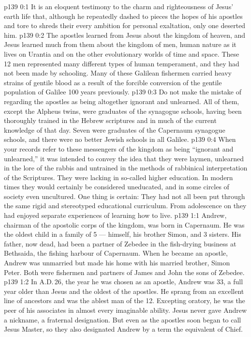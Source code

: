 \author{Midwayer Commission}
\vs p139 0:1 It is an eloquent testimony to the charm and righteousness of Jesus’ earth life that, although he repeatedly dashed to pieces the hopes of his apostles and tore to shreds their every ambition for personal exaltation, only one deserted him.
\vs p139 0:2 The apostles learned from Jesus about the kingdom of heaven, and Jesus learned much from them about the kingdom of men, human nature as it lives on Urantia and on the other evolutionary worlds of time and space. These 12 men represented many different types of human temperament, and they had not been made  by schooling. Many of these Galilean fishermen carried heavy strains of gentile blood as a result of the forcible conversion of the gentile population of Galilee 100 years previously.
\vs p139 0:3 \pc Do not make the mistake of regarding the apostles as being altogether ignorant and unlearned. All of them, except the Alpheus twins, were graduates of the synagogue schools, having been thoroughly trained in the Hebrew scriptures and in much of the current knowledge of that day. Seven were graduates of the Capernaum synagogue schools, and there were no better Jewish schools in all Galilee.
\vs p139 0:4 When your records refer to these messengers of the kingdom as being “ignorant and unlearned,” it was intended to convey the idea that they were laymen, unlearned in the lore of the rabbis and untrained in the methods of rabbinical interpretation of the Scriptures. They were lacking in so\hyp{}called higher education. In modern times they would certainly be considered uneducated, and in some circles of society even uncultured. One thing is certain: They had not all been put through the same rigid and stereotyped educational curriculum. From adolescence on they had enjoyed separate experiences of learning how to live.
\vs p139 1:1 Andrew, chairman of the apostolic corps of the kingdom, was born in Capernaum. He was the oldest child in a family of 5 --- himself, his brother Simon, and 3 sisters. His father, now dead, had been a partner of Zebedee in the fish\hyp{}drying business at Bethsaida, the fishing harbour of Capernaum. When he became an apostle, Andrew was unmarried but made his home with his married brother, Simon Peter. Both were fishermen and partners of James and John the sons of Zebedee.
\vs p139 1:2 In A.D.\,26, the year he was chosen as an apostle, Andrew was 33, a full year older than Jesus and the oldest of the apostles. He sprang from an excellent line of ancestors and was the ablest man of the 12. Excepting oratory, he was the peer of his associates in almost every imaginable ability. Jesus never gave Andrew a nickname, a fraternal designation. But even as the apostles soon began to call Jesus Master, so they also designated Andrew by a term the equivalent of Chief.
